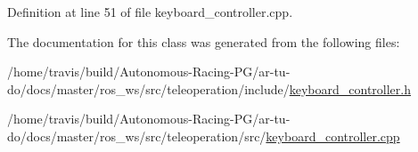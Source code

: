 Definition at line 51 of file keyboard\+\_\+controller.\+cpp.



The documentation for this class was generated from the following files\+:\begin{DoxyCompactItemize}
\item 
/home/travis/build/\+Autonomous-\/\+Racing-\/\+P\+G/ar-\/tu-\/do/docs/master/ros\+\_\+ws/src/teleoperation/include/\hyperlink{keyboard__controller_8h}{keyboard\+\_\+controller.\+h}\item 
/home/travis/build/\+Autonomous-\/\+Racing-\/\+P\+G/ar-\/tu-\/do/docs/master/ros\+\_\+ws/src/teleoperation/src/\hyperlink{keyboard__controller_8cpp}{keyboard\+\_\+controller.\+cpp}\end{DoxyCompactItemize}
